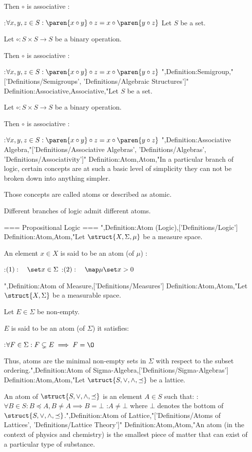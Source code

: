Then $\circ$ is associative :

:$\forall x, y, z \in S: \paren {x \circ y} \circ z = x \circ \paren {y \circ z}$
Let $S$ be a set.

Let $\circ : S \times S \to S$ be a binary operation.


Then $\circ$ is associative :

:$\forall x, y, z \in S: \paren {x \circ y} \circ z = x \circ \paren {y \circ z}$
",Definition:Semigroup,"['Definitions/Semigroups', 'Definitions/Algebraic Structures']"
Definition:Associative,Associative,"Let $S$ be a set.

Let $\circ : S \times S \to S$ be a binary operation.


Then $\circ$ is associative :

:$\forall x, y, z \in S: \paren {x \circ y} \circ z = x \circ \paren {y \circ z}$
",Definition:Associative Algebra,"['Definitions/Associative Algebras', 'Definitions/Algebras', 'Definitions/Associativity']"
Definition:Atom,Atom,"In a particular branch of logic, certain concepts are at such a basic level of simplicity they can not be broken down into anything simpler.

Those concepts are called atoms or described as atomic.


Different branches of logic admit different atoms.


=== Propositional Logic ===
",Definition:Atom (Logic),['Definitions/Logic']
Definition:Atom,Atom,"Let $\struct {X, \Sigma, \mu}$ be a measure space.


An element $x \in X$ is said to be an atom (of $\mu$) :

:$(1): \quad \set x \in \Sigma$
:$(2): \quad \map \mu {\set x} > 0$

",Definition:Atom of Measure,['Definitions/Measures']
Definition:Atom,Atom,"Let $\struct {X, \Sigma}$ be a measurable space.

Let $E \in \Sigma$ be non-empty.


$E$ is said to be an atom (of $\Sigma$)  it satisfies:

:$\forall F \in \Sigma: F \subsetneq E \implies F = \O$


Thus, atoms are the minimal non-empty sets in $\Sigma$ with respect to the subset ordering.",Definition:Atom of Sigma-Algebra,['Definitions/Sigma-Algebras']
Definition:Atom,Atom,"Let $\struct {S, \vee, \wedge, \preceq}$ be a lattice.


An atom of $\struct {S, \vee, \wedge, \preceq}$ is an element $A \in S$ such that:
:$\forall B \in S: B \preceq A, B \ne A \implies B = \bot$
:$A \ne \bot$
where $\bot$ denotes the bottom of $\struct {S, \vee, \wedge, \preceq}$.",Definition:Atom of Lattice,"['Definitions/Atoms of Lattices', 'Definitions/Lattice Theory']"
Definition:Atom,Atom,"An atom (in the context of physics and chemistry) is the smallest piece of matter that can exist of a particular type of substance.



